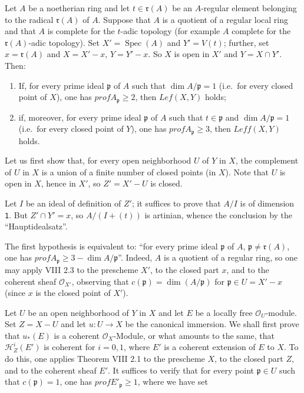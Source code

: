 \documentclass[
]{article}
\providecommand{\tightlist}{%
  \setlength{\itemsep}{0pt}\setlength{\parskip}{0pt}}
\begin{document}
Let \(A\) be a noetherian ring and let \(t \in \mathfrak{r}(A)\) be an
\(A\)-regular element belonging to the radical \(\mathfrak{r}(A)\) of
\(A\). Suppose that \(A\) is a quotient of a regular local ring and that
\(A\) is complete for the \(t\)-adic topology (for example \(A\)
complete for the \(\mathfrak{r}(A)\)-adic topology). Set
\(X' = \operatorname{Spec}(A)\) and \(Y' = V(t)\); further, set
\(x = \mathfrak{r}(A)\) and \(X = X' - {x}\), \(Y = Y' - {x}\). So \(X\)
is open in \(X'\) and \(Y = X \cap Y'\). Then:

\begin{enumerate}
\def\labelenumi{\arabic{enumi}.}
\tightlist
\item
  If, for every prime ideal \(\mathfrak{p}\) of \(A\) such that
  \(\dim A/\mathfrak{p} = 1\) (i.e.~for every closed point of \(X\)),
  one has \(prof A_{\mathfrak{p}} \geqslant 2\), then \(Lef(X, Y)\)
  holds;
\item
  if, moreover, for every prime ideal \(\mathfrak{p}\) of \(A\) such
  that \(t \in \mathfrak{p}\) and \(\dim A/\mathfrak{p} = 1\) (i.e.~for
  every closed point of \(Y\)), one has
  \(prof A_{\mathfrak{p}} \geqslant 3\), then \(Leff(X, Y)\) holds.
\end{enumerate}

Let us first show that, for every open neighborhood \(U\) of \(Y\) in
\(X\), the complement of \(U\) in \(X\) is a union of a finite number of
closed points (in \(X\)). Note that \(U\) is open in \(X\), hence in
\(X'\), so \(Z' = X' - U\) is closed.

Let \(I\) be an ideal of definition of \(Z'\); it suffices to prove that
\(A/I\) is of dimension \texttt{1}. But \(Z' \cap Y' = {x}\), so
\(A/(I + (t))\) is artinian, whence the conclusion by the
``Hauptidealsatz''.

The first hypothesis is equivalent to: ``for every prime ideal
\(\mathfrak{p}\) of \(A\), \(\mathfrak{p} \neq \mathfrak{r}(A)\), one
has \(prof A_{\mathfrak{p}} \geqslant 3 - \dim A/\mathfrak{p}\)''.
Indeed, \(A\) is a quotient of a regular ring, so one may apply VIII 2.3
to the prescheme \(X'\), to the closed part \({x}\), and to the coherent
sheaf \(\mathcal{O}_{X'}\), observing that
\(c(\mathfrak{p}) = \dim(A/\mathfrak{p})\) for
\(\mathfrak{p} \in U = X' - {x}\) (since \(x\) is the closed point of
\(X'\)).

Let \(U\) be an open neighborhood of \(Y\) in \(X\) and let \(E\) be a
locally free \(\mathcal{O}_{U}\)-module. Set \(Z = X - U\) and let
\(u: U \to X\) be the canonical immersion. We shall first prove that
\(u_{*}(E)\) is a coherent \(\mathcal{O}_{X}\)-Module, or what amounts
to the same, that \(\mathcal{H}^{i}_{Z}(E')\) is coherent for
\(i = 0, 1\), where \(E'\) is a coherent extension of \(E\) to \(X\). To
do this, one applies Theorem VIII 2.1 to the prescheme \(X\), to the
closed part \(Z\), and to the coherent sheaf \(E'\). It suffices to
verify that for every point \(\mathfrak{p} \in U\) such that
\(c(\mathfrak{p}) = 1\), one has \(prof E'_{\mathfrak{p}} \geqslant 1\),
where we have set
\end{document}
